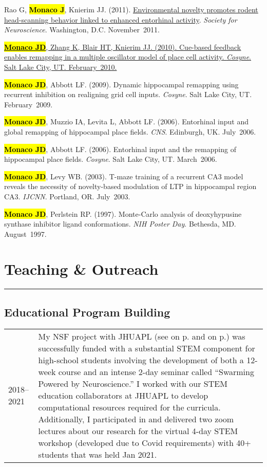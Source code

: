 \documentclass[10pt]{article}
\newcommand{\itemtitle}[1]{{\color{hopkinsblue}\ul{#1}}}
\newcommand{\unpubtitle}[1]{{\color{hopkinsblue} #1}}
\newcommand{\joehl}[1]{\hl{\textbf{#1}}}
\newcommand{\nameonpdottwo}[2]{\textcolor{hopkinsblue}{\emph{\nameref{sec:#1}} on
  p.\pageref{sec:#1}} and \textcolor{hopkinsblue}{\emph{\nameref{sec:#2}} on p.\pageref{sec:#2}}}
\newcommand{\newsection}[2]{%
  \section*{#1}
  \vspace{-.125in}
  \hrule
  \vspace{.22in}
  \label{sec:#2}
}
\begin{document}
\begin{description}
    {Rao G, \joehl{Monaco J}, Knierim JJ. (2011). \itemtitle{Environmental
        novelty promotes rodent head-scanning behavior linked to enhanced entorhinal
      activity}. \emph{Society for Neuroscience}. Washington,
    D.C. November~2011.}
  \item[\quad]
    \href{https://www.frontiersin.org/10.3389/conf.fnins.2010.03.00192/event_abstract}
    {\joehl{Monaco JD}, Zhang K, Blair HT, Knierim JJ. (2010).
      \itemtitle{Cue-based feedback enables remapping in a multiple oscillator
      model of place cell activity}. \emph{Cosyne}. Salt Lake City, UT.
    February~2010.}
  \item[\quad] \joehl{Monaco JD}, Abbott LF. (2009). \unpubtitle{Dynamic
      hippocampal remapping using recurrent inhibition on realigning grid cell
    inputs}. \emph{Cosyne}. Salt Lake City, UT. February~2009.
  \item[\quad] \joehl{Monaco JD}, Muzzio IA, Levita L, Abbott LF. (2006).
    \unpubtitle{Entorhinal input and global remapping of hippocampal place
    fields}. \emph{CNS}. Edinburgh, UK. July~2006.
  \item[\quad] \joehl{Monaco JD}, Abbott LF. (2006). \unpubtitle{Entorhinal
    input and the remapping of hippocampal place fields}. \emph{Cosyne}. Salt Lake
    City, UT. March~2006.
  \item[\quad] \joehl{Monaco JD}, Levy WB. (2003). \unpubtitle{T-maze training
      of a recurrent CA3 model reveals the necessity of novelty-based modulation of
    LTP in hippocampal region CA3}. \emph{IJCNN}. Portland, OR. July~2003.
  \item[\quad] \joehl{Monaco JD}, Perlstein RP. (1997). \unpubtitle{Monte-Carlo
    analysis of deoxyhypusine synthase inhibitor ligand conformations}. \emph{NIH
    Poster Day}. Bethesda, MD. August~1997.
\end{description}


\newsection{Teaching \& Outreach}{teaching}

\subsection*{Educational Program Building}

\begin{tabular}{@{\hspace{0.2in}}l>{\raggedright\arraybackslash}p{}}
  2018--2021 \hspace{0.1in} & My NSF project with JHUAPL (see
  \nameonpdottwo{nsfaward}{nsfgrant}) was successfully funded with a substantial
  STEM component for high-school students involving the development of both
  a 12-week course and an intense 2-day seminar called ``Swarming Powered by
  Neuroscience.'' I worked with our STEM education collaborators at JHUAPL to
  develop computational resources required for the curricula. Additionally, I
  participated in and delivered two zoom lectures about our research for the
  virtual 4-day STEM workshop (developed due to Covid requirements) with 40+
  students that was held Jan 2021.
\end{tabular}
\end{document}
